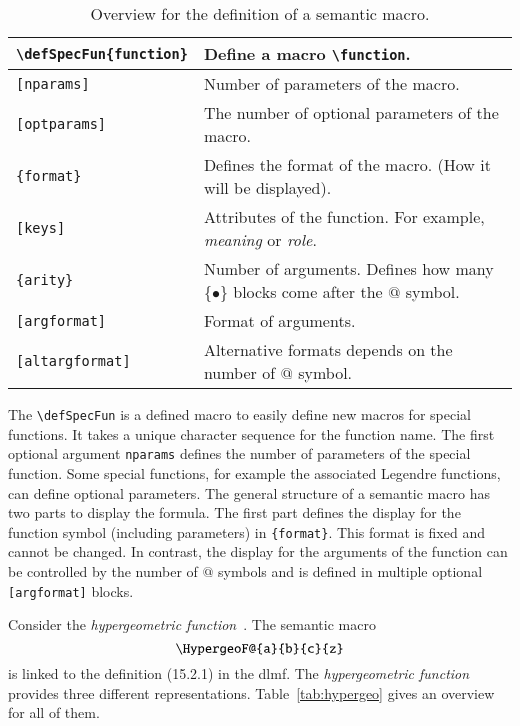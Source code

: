 \begin{table}[ht]
\centering
\begin{tabular}{lp{7cm}}
	\hline
	\verb|\defSpecFun{function}| & Define a macro \verb|\function|.\\\hline
	\hspace*{0.5cm}\verb|[nparams]| & Number of parameters of the macro.\\\hline
	\hspace*{0.5cm}\verb|[optparams]| & The number of optional parameters of the macro.\\\hline
	\hspace*{0.5cm}\verb|{format}| & Defines the format of the macro. (How it will be displayed).\\\hline
	\hspace*{0.5cm}\verb|[keys]| & Attributes of the function. For example, \textit{meaning} or \textit{role}.\\\hline
	\hspace*{0.5cm}\verb|{arity}| & Number of arguments. Defines how many \{$\bullet$\} blocks come after the $@$ symbol.\\\hline
	\hspace*{0.5cm}\verb|[argformat]| & Format of arguments.\\\hline
	\hspace*{0.5cm}\verb|[altargformat]| & Alternative formats depends on the number of $@$ symbol.\\\hline
\end{tabular}
\caption{Overview for the definition of a semantic macro.}
\label{tab:macro-def}
\end{table}

The \verb|\defSpecFun| is a defined macro to easily define new macros for special functions. It takes a unique character sequence for the function name. The first optional argument \verb|nparams| defines the number of parameters of the special function. Some special functions, for example the associated Legendre functions, can define optional parameters. The general structure of a semantic macro has two parts to display the formula. The first part defines the display for the function symbol (including parameters) in \verb|{format}|. This format is fixed and cannot be changed. In contrast, the display for the arguments of the function can be controlled by the number of $@$ symbols and is defined in multiple optional \verb|[argformat]| blocks.

Consider the \textit{hypergeometric function}~\cite[(15.2.1)]{NIST:DLMF}. The semantic macro 
\begin{equation}
	\verb|\HypergeoF@{a}{b}{c}{z}| 
\end{equation}
is linked to the definition (15.2.1) in the \gls{dlmf}. The \textit{hypergeometric function} provides three different representations. Table~\ref{tab:hypergeo} gives an overview for all of them.

